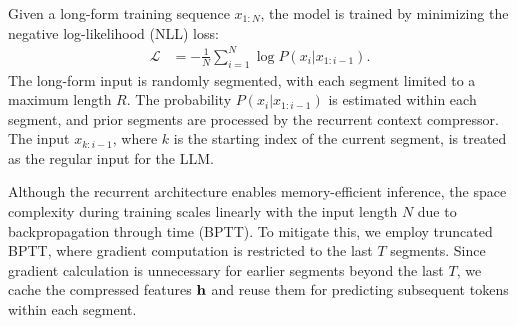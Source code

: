 Given a long-form training sequence $x_{1:N}$, the model is trained by minimizing the negative log-likelihood (NLL) loss:
\begin{align}
    \mathcal{L} &= -\frac{1}{N} \sum_{i=1}^{N} \log P(x_i | x_{1:i-1}).
    \label{eq:training_objective}
\end{align}
The long-form input is randomly segmented, with each segment limited to a maximum length $R$. The probability $P(x_i | x_{1:i-1})$ is estimated within each segment, and prior segments are processed by the recurrent context compressor. The input $x_{k:i-1}$, where $k$ is the starting index of the current segment, is treated as the regular input for the LLM.

Although the recurrent architecture enables memory-efficient inference, the space complexity during training scales linearly with the input length $N$ due to backpropagation through time (BPTT). To mitigate this, we employ truncated BPTT, where gradient computation is restricted to the last $T$ segments. Since gradient calculation is unnecessary for earlier segments beyond the last $T$, we cache the compressed features $\mathbf{h}$ and reuse them for predicting subsequent tokens within each segment.

